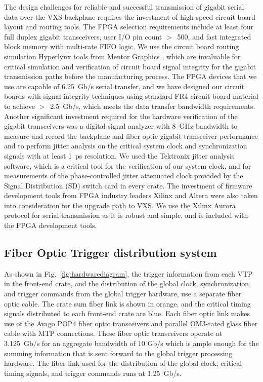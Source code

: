 The design challenges for reliable and successful transmission of gigabit serial data over the VXS backplane requires the investment of high-speed circuit board layout and routing tools.  The FPGA selection requirements include at least four full duplex gigabit transceivers, user I/O pin count $>$~500, and fast integrated block memory with multi-rate FIFO logic. We use the circuit board routing simulation Hyperlynx tools from Mentor Graphics \cite{hyperlynx-ref}, which are invaluable for critical simulation and verification of circuit board signal integrity for the gigabit transmission paths before the manufacturing process.  The FPGA devices that we use are capable of 6.25~Gb/s serial transfer, and we have designed our circuit boards with signal integrity techniques using standard FR4 circuit board material to achieve $>$~2.5~Gb/s, which meets the data transfer bandwidth requirements. 
Another significant investment required for the hardware verification of the gigabit transceivers was a digital signal analyzer with 8~GHz bandwidth to measure and record the backplane and fiber optic gigabit transceiver performance and to perform jitter analysis on the critical system clock and synchronization signals with at least 1~ps resolution.  We used the Tektronix jitter analysis software, which is a critical tool for the verification of our system clock, and for measurements of the phase-controlled jitter attenuated clock provided by the Signal Distribution (SD) switch card in every crate. The investment of firmware development tools from FPGA industry leaders Xilinx and Altera were also taken into consideration for the upgrade path to VXS. We use the Xilinx Aurora protocol for serial transmission as it is robust and simple, and is included with the FPGA development tools.  


\subsection{Fiber Optic Trigger distribution system}

As shown in Fig.~\ref{fig:hardwarediagram}, the trigger information from each VTP in the front-end crate, and the distribution of the global clock, synchronization, and trigger commands from the global trigger hardware, use a separate fiber optic cable.  The crate sum fiber link is shown in orange, and the critical timing signals distributed to each front-end crate are blue.  Each fiber optic link makes use of the Avago POP4 fiber optic transceivers and parallel OM3-rated glass fiber cable with MTP connections. These fiber optic transceivers operate at 3.125~Gb/s for an aggregate bandwidth of 10 Gb/s which is ample enough for the summing information that is sent forward to the global trigger processing hardware.  The fiber link used for the distribution of the global clock, critical timing signals, and trigger commands runs at 1.25~Gb/s.

